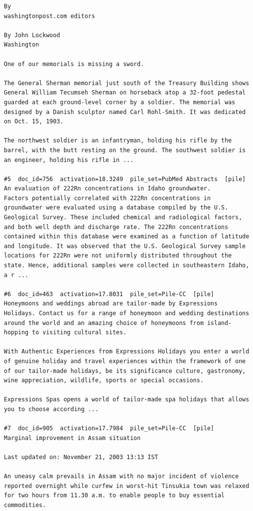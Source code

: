 \begin{verbatim}
By
washingtonpost.com editors

By John Lockwood
Washington

One of our memorials is missing a sword.

The General Sherman memorial just south of the Treasury Building shows General William Tecumseh Sherman on horseback atop a 32-foot pedestal guarded at each ground-level corner by a soldier. The memorial was designed by a Danish sculptor named Carl Rohl-Smith. It was dedicated on Oct. 15, 1903.

The northwest soldier is an infantryman, holding his rifle by the barrel, with the butt resting on the ground. The southwest soldier is an engineer, holding his rifle in ...

#5  doc_id=756  activation=18.3249  pile_set=PubMed Abstracts  [pile]
An evaluation of 222Rn concentrations in Idaho groundwater.
Factors potentially correlated with 222Rn concentrations in groundwater were evaluated using a database compiled by the U.S. Geological Survey. These included chemical and radiological factors, and both well depth and discharge rate. The 222Rn concentrations contained within this database were examined as a function of latitude and longitude. It was observed that the U.S. Geological Survey sample locations for 222Rn were not uniformly distributed throughout the state. Hence, additional samples were collected in southeastern Idaho, a r ...

#6  doc_id=463  activation=17.8031  pile_set=Pile-CC  [pile]
Honeymoons and weddings abroad are tailor-made by Expressions Holidays. Contact us for a range of honeymoon and wedding destinations around the world and an amazing choice of honeymoons from island-hopping to visiting cultural sites.

With Authentic Experiences from Expressions Holidays you enter a world of genuine holiday and travel experiences within the framework of one of our tailor-made holidays, be its significance culture, gastronomy, wine appreciation, wildlife, sports or special occasions.

Expressions Spas opens a world of tailor-made spa holidays that allows you to choose according ...

#7  doc_id=905  activation=17.7984  pile_set=Pile-CC  [pile]
Marginal improvement in Assam situation

Last updated on: November 21, 2003 13:13 IST

An uneasy calm prevails in Assam with no major incident of violence reported overnight while curfew in worst-hit Tinsukia town was relaxed for two hours from 11.30 a.m. to enable people to buy essential commodities.


\end{verbatim}
